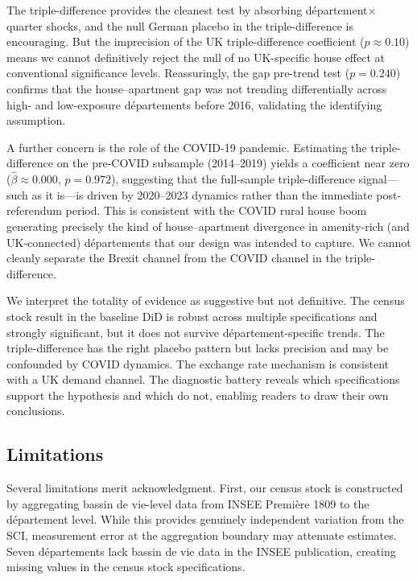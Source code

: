 \documentclass[12pt]{article}
\begin{document}
The triple-difference provides the cleanest test by absorbing d\'epartement$\times$quarter shocks, and the null German placebo in the triple-difference is encouraging. But the imprecision of the UK triple-difference coefficient ($p \approx 0.10$) means we cannot definitively reject the null of no UK-specific house effect at conventional significance levels. Reassuringly, the gap pre-trend test ($p = 0.240$) confirms that the house--apartment gap was not trending differentially across high- and low-exposure d\'epartements before 2016, validating the identifying assumption.

A further concern is the role of the COVID-19 pandemic. Estimating the triple-difference on the pre-COVID subsample (2014--2019) yields a coefficient near zero ($\hat{\beta} \approx 0.000$, $p = 0.972$), suggesting that the full-sample triple-difference signal---such as it is---is driven by 2020--2023 dynamics rather than the immediate post-referendum period. This is consistent with the COVID rural house boom generating precisely the kind of house--apartment divergence in amenity-rich (and UK-connected) d\'epartements that our design was intended to capture. We cannot cleanly separate the Brexit channel from the COVID channel in the triple-difference.

We interpret the totality of evidence as suggestive but not definitive. The census stock result in the baseline DiD is robust across multiple specifications and strongly significant, but it does not survive d\'epartement-specific trends. The triple-difference has the right placebo pattern but lacks precision and may be confounded by COVID dynamics. The exchange rate mechanism is consistent with a UK demand channel. The diagnostic battery reveals which specifications support the hypothesis and which do not, enabling readers to draw their own conclusions.

\subsection{Limitations}

Several limitations merit acknowledgment. First, our census stock is constructed by aggregating bassin de vie-level data from INSEE Premi\`ere 1809 to the d\'epartement level. While this provides genuinely independent variation from the SCI, measurement error at the aggregation boundary may attenuate estimates. Seven d\'epartements lack bassin de vie data in the INSEE publication, creating missing values in the census stock specifications.
\end{document}
